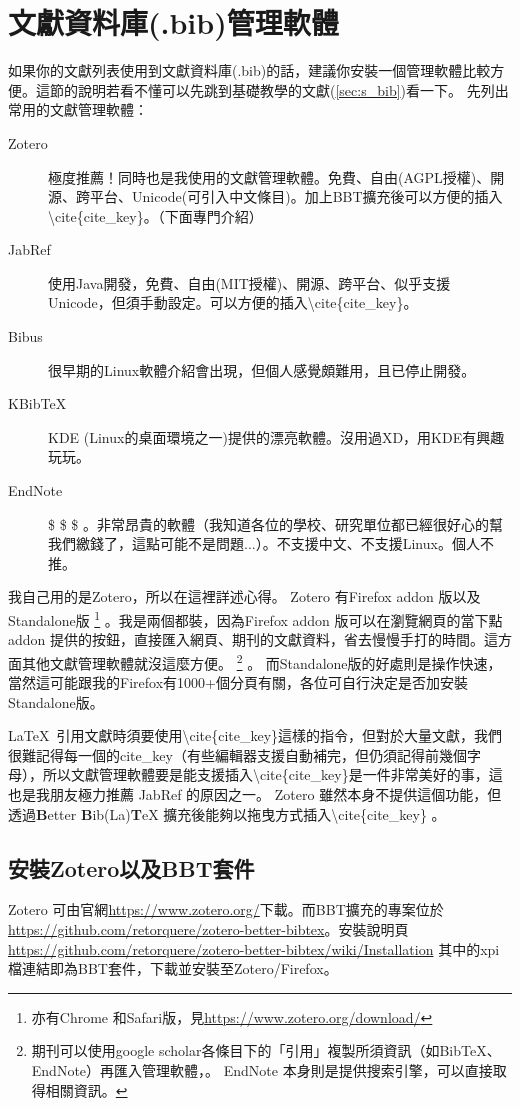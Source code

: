 \documentclass[class=NCU_thesis, crop=false, float=true]{standalone}
\begin{document}
\section{文獻資料庫(.bib)管理軟體}
如果你的文獻列表使用到文獻資料庫(.bib)的話，建議你安裝一個管理軟體比較方便。這節的說明若看不懂可以先跳到基礎教學的文獻(\cref{sec:s_bib})看一下。
先列出常用的文獻管理軟體：
\begin{description}
    \item[Zotero] 極度推薦！同時也是我使用的文獻管理軟體。免費、自由(AGPL授權)、開源、跨平台、Unicode(可引入中文條目)。加上BBT擴充後可以方便的插入\textbackslash{}cite\{cite\_key\}。（下面專門介紹）
    \item[JabRef] 使用Java開發，免費、自由(MIT授權)、開源、跨平台、似乎支援Unicode，但須手動設定。可以方便的插入\textbackslash{}cite\{cite\_key\}。
    \item[Bibus] 很早期的Linux軟體介紹會出現，但個人感覺頗難用，且已停止開發。
    \item[KBibTeX] KDE (Linux的桌面環境之一)提供的漂亮軟體。沒用過XD，用KDE有興趣玩玩。
    \item[EndNote] \$ \$ \$ 。非常昂貴的軟體（我知道各位的學校、研究單位都已經很好心的幫我們繳錢了，這點可能不是問題...）。不支援中文、不支援Linux。個人不推。
\end{description}
我自己用的是Zotero，所以在這裡詳述心得。
Zotero 有Firefox addon 版以及Standalone版
\footnote{亦有Chrome 和Safari版，見\url{https://www.zotero.org/download/}}
。我是兩個都裝，因為Firefox addon 版可以在瀏覽網頁的當下點addon 提供的按鈕，直接匯入網頁、期刊的文獻資料，省去慢慢手打的時間。這方面其他文獻管理軟體就沒這麼方便。
\footnote{期刊可以使用google scholar各條目下的「引用」複製所須資訊（如BibTeX、EndNote）再匯入管理軟體，。 EndNote 本身則是提供搜索引擎，可以直接取得相關資訊。}
。
而Standalone版的好處則是操作快速，當然這可能跟我的Firefox有1000+個分頁有關，各位可自行決定是否加安裝Standalone版。

\LaTeX\  引用文獻時須要使用\textbackslash{}cite\{cite\_key\}這樣的指令，但對於大量文獻，我們很難記得每一個的cite\_key（有些編輯器支援自動補完，但仍須記得前幾個字母），所以文獻管理軟體要是能支援插入\textbackslash{}cite\{cite\_key\}是一件非常美好的事，這也是我朋友極力推薦 JabRef 的原因之一。 Zotero 雖然本身不提供這個功能，但透過\textbf{B}etter \textbf{B}ib(La)\textbf{T}eX 擴充後能夠以拖曳方式插入\textbackslash{}cite\{cite\_key\} 。

\subsection{安裝Zotero以及BBT套件}
Zotero 可由官網\url{https://www.zotero.org/}下載。而BBT擴充的專案位於\url{https://github.com/retorquere/zotero-better-bibtex}。安裝說明頁 \url{https://github.com/retorquere/zotero-better-bibtex/wiki/Installation} 其中的xpi檔連結即為BBT套件，下載並安裝至Zotero/Firefox。
\end{document}

